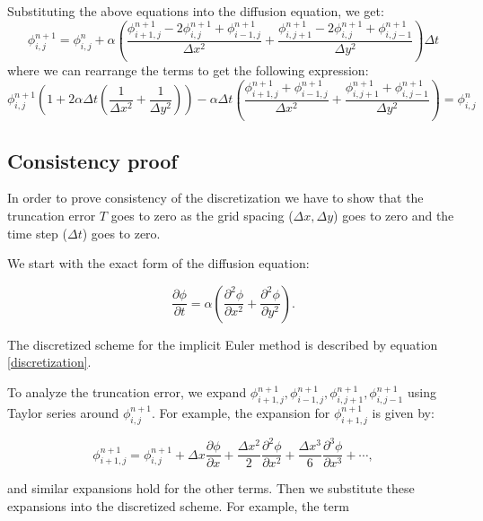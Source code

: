 \documentclass{article}
\begin{document}
Substituting the above equations into the diffusion equation, we get:
\begin{equation} \label{discretization}
  \phi^{n+1}_{i,j} = \phi^{n}_{i,j} + \alpha \left( \frac{\phi^{n+1}_{i+1,j} - 2\phi^{n+1}_{i,j} + \phi^{n+1}_{i-1,j}}{\Delta x^2} + \frac{\phi^{n+1}_{i,j+1} - 2\phi^{n+1}_{i,j} + \phi^{n+1}_{i,j-1}}{\Delta y^2} \right) \Delta t
\end{equation}
where we can rearrange the terms to get the following expression:
\begin{equation}
  \phi^{n+1}_{i,j} (1 + 2 \alpha \Delta t(\frac{1}{\Delta x^2} + \frac{1}{\Delta y^2})) - \alpha \Delta t \left( \frac{\phi^{n+1}_{i+1,j} + \phi^{n+1}_{i-1,j}}{\Delta x^2} + \frac{\phi^{n+1}_{i,j+1} + \phi^{n+1}_{i,j-1}}{\Delta y^2} \right) = \phi^{n}_{i,j}
\end{equation}

\subsection{Consistency proof}
In order to prove consistency of the discretization we have to show that the truncation error $T$ goes to zero as the grid spacing ($\Delta x, \Delta y$) goes to zero and the time step ($\Delta t$) goes to zero.


We start with the exact form of the diffusion equation:

\begin{equation}
\frac{\partial \phi}{\partial t} = \alpha \left( \frac{\partial^2 \phi}{\partial x^2} + \frac{\partial^2 \phi}{\partial y^2} \right).
\end{equation}

The discretized scheme for the implicit Euler method is described by equation \eqref{discretization}.

To analyze the truncation error, we expand \( \phi_{i+1,j}^{n+1}, \phi_{i-1,j}^{n+1}, \phi_{i,j+1}^{n+1}, \phi_{i,j-1}^{n+1} \) using Taylor series around \( \phi_{i,j}^{n+1} \). For example, the expansion for \( \phi_{i+1, j}^{n+1} \) is given by:

\begin{equation*}
\phi_{i+1,j}^{n+1} = \phi_{i,j}^{n+1} + \Delta x \frac{\partial \phi}{\partial x} + \frac{\Delta x^2}{2} \frac{\partial^2 \phi}{\partial x^2} + \frac{\Delta x^3}{6} \frac{\partial^3 \phi}{\partial x^3} + \cdots,
\end{equation*}

and similar expansions hold for the other terms. Then we substitute these expansions into the discretized scheme. For example, the term 
\end{document}
